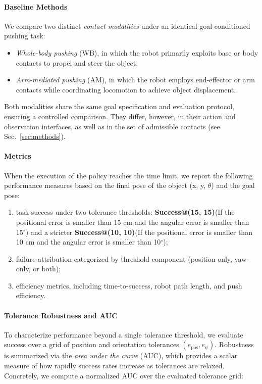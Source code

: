 \paragraph{Baseline Methods}
We compare two distinct \emph{contact modalities} under an identical goal-conditioned pushing task:
\begin{itemize}
\item \textit{Whole-body pushing} (WB), in which the robot primarily exploits base or body contacts to propel and steer the object;
\item \textit{Arm-mediated pushing} (AM), in which the robot employs end-effector or arm contacts while coordinating locomotion to achieve object displacement.
\end{itemize}
Both modalities share the same goal specification and evaluation protocol, ensuring a controlled comparison. They differ, however, in their action and observation interfaces, as well as in the set of admissible contacts (see Sec.~\ref{sec:methods}).

\paragraph{Metrics}
When the execution of the policy reaches the time limit, we report the following performance measures based on the final pose of the object (x, y, $\theta$) and the goal pose:
\begin{enumerate}
    \item task success under two tolerance thresholds: \textbf{Success@(15, 15)}(If the positional error is smaller than 15 cm and the angular error is smaller than 15$^\circ$) and a stricter \textbf{Success@(10, 10)}(If the positional error is smaller than 10 cm and the angular error is smaller than 10$^\circ$); 
    \item failure attribution categorized by threshold component (position-only, yaw-only, or both);
    \item efficiency metrics, including time-to-success, robot path length, and push efficiency.
\end{enumerate}


\paragraph{Tolerance Robustness and AUC}
To characterize performance beyond a single tolerance threshold, we evaluate success over a grid of position and orientation tolerances $(e_{\text{pos}}, e_{\psi})$. Robustness is summarized via the \emph{area under the curve} (AUC), which provides a scalar measure of how rapidly success rates increase as tolerances are relaxed. Concretely, we compute a normalized AUC over the evaluated tolerance grid:

